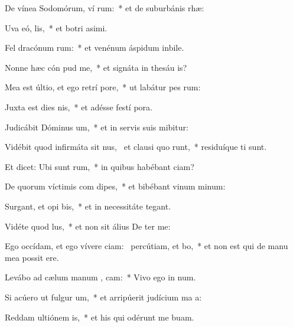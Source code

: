 \item De vínea Sodomórum, ví rum:~* et de suburbánis rhæ:
\item Uva eó,  lis,~* et botri asimi.
\item Fel dracónum  rum:~* et venénum áspidum inbile.
\item Nonne hæc cón  pud me,~* et signáta in thesáu is?
\item Mea est últio, et ego retrí  pore,~* ut labátur pes rum:
\item Juxta est dies nis,~* et adésse festí pora.
\item Judicábit Dóminus  um,~* et in servis suis mibitur:
\item Vidébit quod infirmáta sit nus,~\pscross{} et clausi quo runt,~* residuíque ti sunt.
\item Et dicet: Ubi sunt  rum,~* in quibus habébant ciam?
\item De quorum víctimis com dipes,~* et bibébant vinum minum:
\item Surgant, et opi bis,~* et in necessitáte  tegant.
\item Vidéte quod   lus,~* et non sit álius De ter me:
\item Ego occídam, et ego vívere ciam:~\pscross{} percútiam, et  bo,~* et non est qui de manu mea possit ere.
\item Levábo ad cælum manum ,  cam:~* Vivo ego in num.
\item Si acúero ut fulgur  um,~* et arripúerit judícium ma a:
\item Reddam ultiónem  is,~* et his qui odérunt me buam.
